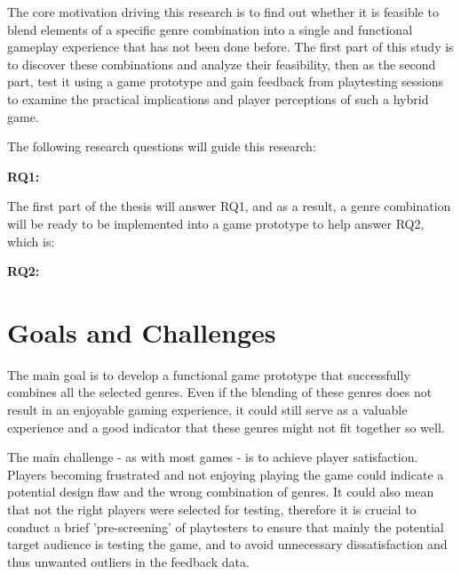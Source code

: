 The core motivation driving this research is to find out whether it is feasible to blend elements of a specific genre combination into a single and functional gameplay experience that has not been done before. The first part of this study is to discover these combinations and analyze their feasibility, then as the second part, test it using a game prototype and gain feedback from playtesting sessions to examine the practical implications and player perceptions of such a hybrid game.

The following research questions will guide this research:

\textbf{RQ1:} \researchQuestionOne

The first part of the thesis will answer RQ1, and as a result, a genre combination will be ready to be implemented into a game prototype to help answer RQ2, which is:


\textbf{RQ2:} \researchQuestionTwo



\section{Goals and Challenges}

The main goal is to develop a functional game prototype that successfully combines all the selected genres. Even if the blending of these genres does not result in an enjoyable gaming experience, it could still serve as a valuable experience and a good indicator that these genres might not fit together so well.

The main challenge - as with most games - is to achieve player satisfaction. Players becoming frustrated and not enjoying playing the game could indicate a potential design flaw and the wrong combination of genres. It could also mean that not the right players were selected for testing, therefore it is crucial to conduct a brief 'pre-screening' of playtesters to ensure that mainly the potential target audience is testing the game, and to avoid unnecessary dissatisfaction and thus unwanted outliers in the feedback data.